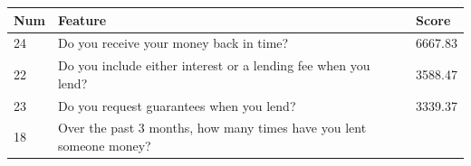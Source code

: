 \begin{longtable}[]{@{}lll@{}}
\toprule
\begin{minipage}[b]{0.05\columnwidth}\raggedright
Num\strut
\end{minipage} & \begin{minipage}[b]{0.77\columnwidth}\raggedright
Feature\strut
\end{minipage} & \begin{minipage}[b]{0.09\columnwidth}\raggedright
Score\strut
\end{minipage}\tabularnewline
\midrule
\endhead
\begin{minipage}[t]{0.05\columnwidth}\raggedright
24\strut
\end{minipage} & \begin{minipage}[t]{0.77\columnwidth}\raggedright
Do you receive your money back in time?\strut
\end{minipage} & \begin{minipage}[t]{0.09\columnwidth}\raggedright
6667.83\strut
\end{minipage}\tabularnewline
\begin{minipage}[t]{0.05\columnwidth}\raggedright
22\strut
\end{minipage} & \begin{minipage}[t]{0.77\columnwidth}\raggedright
Do you include either interest or a lending fee when you lend?\strut
\end{minipage} & \begin{minipage}[t]{0.09\columnwidth}\raggedright
3588.47\strut
\end{minipage}\tabularnewline
\begin{minipage}[t]{0.05\columnwidth}\raggedright
23\strut
\end{minipage} & \begin{minipage}[t]{0.77\columnwidth}\raggedright
Do you request guarantees when you lend?\strut
\end{minipage} & \begin{minipage}[t]{0.09\columnwidth}\raggedright
3339.37\strut
\end{minipage}\tabularnewline
\begin{minipage}[t]{0.05\columnwidth}\raggedright
18\strut
\end{minipage} & \begin{minipage}[t]{0.77\columnwidth}\raggedright
Over the past 3 months, how many times have you lent someone
money?\strut
\end{minipage} & \begin{minipage}[t]{0.09\columnwidth}\raggedright

\end{minipage}
\end{longtable}
